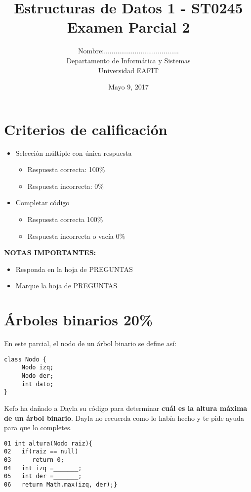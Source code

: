 \documentclass[twocolumn]{article}
\author{
Nombre:....................................... \\
    Departamento de Informática y Sistemas \\
    Universidad EAFIT \\
}
\title{
    Estructuras de Datos 1 - ST0245 \\
    Examen Parcial 2
}
\date{
    Mayo 9, 2017
}
\begin{document}
\vspace{-5cm}
\maketitle


\section*{Criterios de calificación}

\begin{itemize}
\item Selección múltiple con única respuesta
\begin{itemize}
\item Respuesta correcta: 100\%
\item Respuesta incorrecta: 0\%
\end{itemize}

\item Completar código
\begin{itemize}
\item Respuesta correcta 100\%
\item Respuesta incorrecta o vacía 0\%
\end{itemize}
\end{itemize}

\textbf{NOTAS IMPORTANTES:}
\begin{itemize}
	\item Responda en la hoja de PREGUNTAS
	\item Marque la hoja de PREGUNTAS
\end{itemize}



\section{Árboles binarios 20\%}
En este parcial, el nodo de un árbol binario se define así:

{\small
\begin{verbatim}
class Nodo {
     Nodo izq;
     Nodo der;
     int dato;
}
\end{verbatim}
}

Kefo ha dañado a Dayla su código para determinar \textbf{cuál es la altura máxima de un árbol binario}. Dayla no recuerda como lo había hecho y te pide ayuda para que lo completes.

{\small
\begin{verbatim}
01 int altura(Nodo raiz){
02   if(raiz == null)
03      return 0;
04   int izq =_______;
05   int der =_______; 
06   return Math.max(izq, der);}
\end{verbatim}
}
\end{document}
